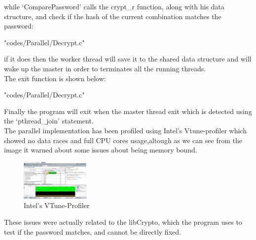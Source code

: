 \documentclass[10pt,twocolumn,letterpaper]{article}
\begin{document}
while `ComparePassword' calls the crypt\_r function, along with his data structure, and check if the hash of the current 
combination matches the password:\\
\begin{lstinputlisting}[language=C,style=CSnippetStyle,caption=Compare Password Function,firstline=35,lastline=40]
		{"codes/Parallel/Decrypt.c"}
\end{lstinputlisting}
if it does then the worker thread will save it to the shared data structure and will wake up the master in order to terminates all the
running threads.\\
The exit function is shown below:\\
\begin{lstinputlisting}[language=C,style=CSnippetStyle,caption=Worker Exit Function,firstline=88,lastline=98]
		{"codes/Parallel/Decrypt.c"}
\end{lstinputlisting}
Finally the program will exit when the master thread exit which is detected using the `pthread\_join' statement.\\
The parallel implementation has been profiled using Intel's Vtune-profiler which showed no data races and full CPU cores usage,altough
as we can see from the image it warned about some issues about being memory bound.\\
\begin{figure}[H]
\centering
\includegraphics[width=0.3\textwidth]{vtune_profiler}
\caption{Intel's VTune-Profiler}
\end{figure}
These issues were actually related to the libCrypto, which the program uses to test if the password matches, and cannot be directly 
fixed.
\end{document}
